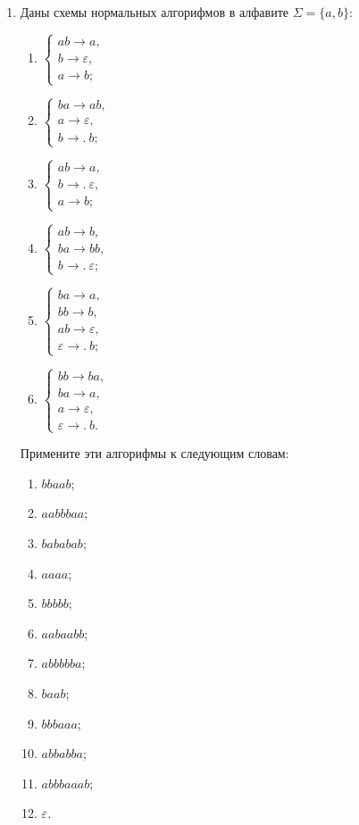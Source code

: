 \documentclass[12pt,a4paper]{article}
\renewcommand{\to}{\longrightarrow}
\newcommand{\tof}{\to\!\!.\ }
\newcommand{\alphabet}[2]{#1=\{#2\}}
\newcommand{\salp}[1]{\alphabet{\Sigma}{#1}}
\begin{document}
\begin{enumerate}
\item Даны схемы нормальных алгорифмов в алфавите $\salp{a,b}$:
\begin{multicols}{3}
  \begin{enumerate}[label=\arabic*)]
\item  $\begin{cases}
  ab\to a,\\
  b\to\varepsilon,\\
  a\to b;
\end{cases}$%
\item $\begin{cases}
  ba\to ab,\\
  a\to\varepsilon,\\
  b\tof b;
\end{cases}$
\item  $\begin{cases}
  ab\to a,\\
  b\tof\varepsilon,\\
  a\to b;
\end{cases}$
\item 
$\begin{cases}
  ab\to b,\\
  ba\to bb,\\
  b\tof \varepsilon;
\end{cases}$
\item $\begin{cases}
ba\to a,\\
bb\to b,\\
ab\to\varepsilon,\\
\varepsilon\tof b;  
\end{cases}$
\item $\begin{cases}
bb\to ba,\\
ba\to a,\\
a\to\varepsilon,\\
\varepsilon\tof b.
\end{cases}$
\end{enumerate}
 \end{multicols}

Примените эти алгорифмы к следующим словам:
\begin{multicols}{3}
\begin{enumerate}
\item $bbaab$;
\item $aabbbaa$;
\item $bababab$;
\item $aaaa$;
\item $bbbbb$;
\item $aabaabb$;
\item $abbbbba$;
\item $baab$;
\item $bbbaaa$;
\item $abbabba$;
\item $abbbaaab$;
\item $\varepsilon$.
\end{enumerate}
\end{multicols}
\newpage


\end{enumerate}
\end{document}
